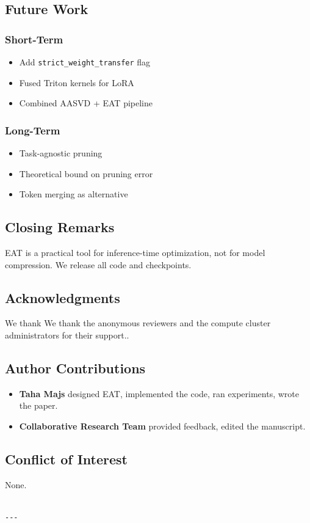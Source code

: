 \subsection{Future Work}

\subsubsection{Short-Term}
\begin{itemize}
\item Add \texttt{strict\_weight\_transfer} flag
\item Fused Triton kernels for LoRA
\item Combined AASVD + EAT pipeline

\end{itemize}
\subsubsection{Long-Term}
\begin{itemize}
\item Task-agnostic pruning
\item Theoretical bound on pruning error
\item Token merging as alternative

\end{itemize}
\subsection{Closing Remarks}

EAT is a practical tool for inference-time optimization, not for model 
compression. We release all code and checkpoints.

\subsection{Acknowledgments}

We thank We thank the anonymous reviewers and the compute cluster administrators for their support..

\subsection{Author Contributions}

\begin{itemize}
\item \textbf{Taha Majs} designed EAT, implemented the code, ran experiments,
  wrote the paper.
\item \textbf{Collaborative Research Team} provided feedback, edited the manuscript.

\end{itemize}
\subsection{Conflict of Interest}

None.
\begin{lstlisting}

---
\end{lstlisting}